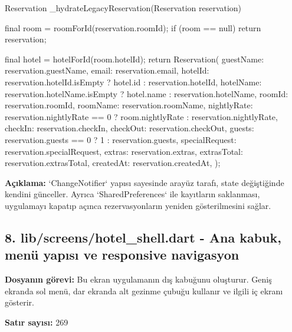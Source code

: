\documentclass[11pt,a4paper]{article}
\begin{document}
\begin{codeblock}
{  Reservation _hydrateLegacyReservation(Reservation reservation) {
    final room = roomForId(reservation.roomId);
    if (room == null) {
      return reservation;
    }

    final hotel = hotelForId(room.hotelId);
    return Reservation(
      guestName: reservation.guestName,
      email: reservation.email,
      hotelId: reservation.hotelId.isEmpty ? hotel.id : reservation.hotelId,
      hotelName:
          reservation.hotelName.isEmpty ? hotel.name : reservation.hotelName,
      roomId: reservation.roomId,
      roomName: reservation.roomName,
      nightlyRate: reservation.nightlyRate == 0
          ? room.nightlyRate
          : reservation.nightlyRate,
      checkIn: reservation.checkIn,
      checkOut: reservation.checkOut,
      guests: reservation.guests == 0 ? 1 : reservation.guests,
      specialRequest: reservation.specialRequest,
      extras: reservation.extras,
      extrasTotal: reservation.extrasTotal,
      createdAt: reservation.createdAt,
    );
  }
}
\end{codeblock}

\textbf{Açıklama:} `ChangeNotifier` yapısı sayesinde arayüz tarafı, state değiştiğinde kendini günceller. Ayrıca `SharedPreferences` ile kayıtların saklanması, uygulamayı kapatıp açınca rezervasyonların yeniden gösterilmesini sağlar.

\clearpage
\subsection{8. lib/screens/hotel\_shell.dart - Ana kabuk, menü yapısı ve responsive navigasyon}
\textbf{Dosyanın görevi:} Bu ekran uygulamanın dış kabuğunu oluşturur. Geniş ekranda sol menü, dar ekranda alt gezinme çubuğu kullanır ve ilgili iç ekranı gösterir.

\textbf{Satır sayısı:} 269
\end{document}
